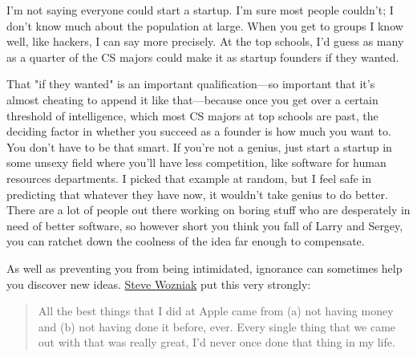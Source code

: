 I'm not saying
                    everyone could start a startup. I'm sure most people
                    couldn't; I don't know much about the population at large.
                    When you get to groups I know well, like hackers, I can say
                    more precisely. At the top schools, I'd guess as many as a
                    quarter of the CS majors could make it as startup founders
                    if they wanted.

That "if they wanted" is an
                    important qualification---so important that it's almost
                    cheating to append it like that---because once you get
                    over a certain threshold of intelligence, which most CS
                    majors at top schools are past, the deciding factor in
                    whether you succeed as a founder is how much you want to.
                    You don't have to be that smart. If you're not a genius,
                    just start a startup in some unsexy field where you'll have
                    less competition, like software for human resources
                    departments. I picked that example at random, but I feel
                    safe in predicting that whatever they have now, it wouldn't
                    take genius to do better. There are a lot of people out
                    there working on boring stuff who are desperately in need of
                    better software, so however short you think you fall of
                    Larry and Sergey, you can ratchet down the coolness of the
                    idea far enough to compensate.

As well as
                    preventing you from being intimidated, ignorance can
                    sometimes help you discover new ideas.
                    \href{http://foundersatwork.com/stevewozniak.html}{Steve Wozniak}
                    put this very strongly:
                  


                  \begin{quote}

                    All the best things that I did at Apple came from (a) not
                    having money and (b) not having done it before, ever. Every
                    single thing that we came out with that was really great,
                    I'd never once done that thing in my life.
                  
\end{quote}

